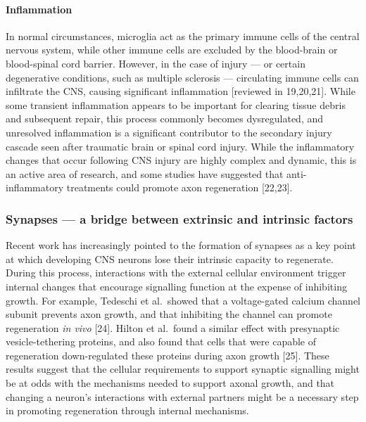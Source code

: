 \documentclass[
  12pt,
  a4paper,
]{book}
\begin{document}
\paragraph{Inflammation}\label{inflammation}

In normal circumstances, microglia act as the primary immune cells of the central nervous system, while other immune cells are excluded by the blood-brain or blood-spinal cord barrier. However, in the case of injury --- or certain degenerative conditions, such as multiple sclerosis --- circulating immune cells can infiltrate the CNS, causing significant inflammation {[}reviewed in 19,20,21{]}. While some transient inflammation appears to be important for clearing tissue debris and subsequent repair, this process commonly becomes dysregulated, and unresolved inflammation is a significant contributor to the secondary injury cascade seen after traumatic brain or spinal cord injury. While the inflammatory changes that occur following CNS injury are highly complex and dynamic, this is an active area of research, and some studies have suggested that anti-inflammatory treatments could promote axon regeneration {[}22,23{]}.

\subsubsection{Synapses --- a bridge between extrinsic and intrinsic factors}\label{synapses-a-bridge-between-extrinsic-and-intrinsic-factors}

Recent work has increasingly pointed to the formation of synapses as a key point at which developing CNS neurons lose their intrinsic capacity to regenerate. During this process, interactions with the external cellular environment trigger internal changes that encourage signalling function at the expense of inhibiting growth. For example, Tedeschi et al.~showed that a voltage-gated calcium channel subunit prevents axon growth, and that inhibiting the channel can promote regeneration \emph{in vivo} {[}24{]}. Hilton et al.~found a similar effect with presynaptic vesicle-tethering proteins, and also found that cells that were capable of regeneration down-regulated these proteins during axon growth {[}25{]}. These results suggest that the cellular requirements to support synaptic signalling might be at odds with the mechanisms needed to support axonal growth, and that changing a neuron's interactions with external partners might be a necessary step in promoting regeneration through internal mechanisms.
\end{document}
